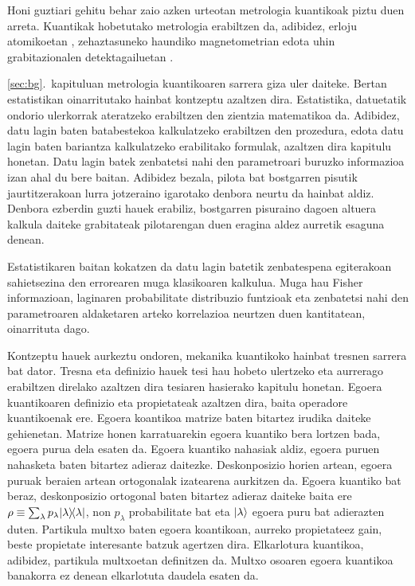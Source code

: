 Honi guztiari gehitu behar zaio azken urteotan metrologia kuantikoak piztu duen arreta.
Kuantikak hobetutako metrologia erabiltzen da, adibidez, erloju atomikoetan \cite{Louchet-Chauvet2010, Borregaard2013, Kessler2014a}, zehaztasuneko haundiko magnetometrian \cite{Wasilewski2010, Eckert2006, Wildermuth2006, Wolfgramm2010, Koschorreck2011, Vengalattore2007, Zhou2010} edota uhin grabitazionalen detektagailuetan \cite{Schnabel2010, TheLIGOScientificCollaboration2011, Demkowicz-Dobrzanski2013}.

\ref{sec:bg}.~kapituluan metrologia kuantikoaren sarrera giza uler daiteke.
Bertan estatistikan oinarritutako hainbat kontzeptu azaltzen dira.
Estatistika, datuetatik ondorio ulerkorrak ateratzeko erabiltzen den zientzia matematikoa da.
Adibidez, datu lagin baten batabestekoa kalkulatzeko erabiltzen den prozedura,
edota datu lagin baten bariantza kalkulatzeko erabilitako formulak, azaltzen dira kapitulu honetan.
Datu lagin batek zenbatetsi nahi den parametroari buruzko informazioa izan ahal du bere baitan.
Adibidez bezala, pilota bat bostgarren pisutik jaurtitzerakoan lurra jotzeraino igarotako denbora neurtu da hainbat aldiz.
Denbora ezberdin guzti hauek erabiliz, bostgarren pisuraino dagoen altuera kalkula daiteke grabitateak pilotarengan duen eragina aldez aurretik esaguna denean.

Estatistikaren baitan kokatzen da datu lagin batetik zenbatespena egiterakoan sahietsezina den errorearen muga klasikoaren kalkulua.
Muga hau Fisher informazioan, laginaren probabilitate distribuzio funtzioak eta zenbatetsi nahi den parametroaren aldaketaren arteko korrelazioa neurtzen duen kantitatean, oinarrituta dago.

Kontzeptu hauek aurkeztu ondoren, mekanika kuantikoko hainbat tresnen sarrera bat dator.
Tresna eta definizio hauek tesi hau hobeto ulertzeko eta aurrerago erabiltzen direlako azaltzen dira tesiaren hasierako kapitulu honetan.
Egoera kuantikoaren definizio eta propietateak azaltzen dira, baita operadore kuantikoenak ere.
Egoera koantikoa matrize baten bitartez irudika daiteke gehienetan.
Matrize honen karratuarekin egoera kuantiko bera lortzen bada, egoera purua dela esaten da.
Egoera kuantiko nahasiak aldiz, egoera puruen nahasketa baten bitartez adieraz daitezke.
Deskonposizio horien artean, egoera puruak beraien artean ortogonalak izatearena aurkitzen da.
Egoera kuantiko bat beraz, deskonposizio ortogonal baten bitartez adieraz daiteke baita ere $\rho\equiv\sum_\lambda p_\lambda \vert{\lambda}\rangle{\!}\langle{\lambda}\vert$, non $p_\lambda$ probabilitate bat eta $\vert{\lambda}\rangle$ egoera puru bat adierazten duten.
Partikula multxo baten egoera koantikoan, aurreko propietateez gain, beste propietate interesante batzuk agertzen dira.
Elkarlotura kuantikoa, adibidez, partikula multxoetan definitzen da.
Multxo osoaren egoera kuantikoa banakorra ez denean elkarlotuta daudela esaten da.

